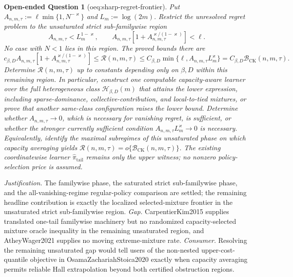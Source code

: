 \documentclass{article}
\newtheorem{openendedquestion}{Open-ended Question}
\begin{document}
\begin{openendedquestion}[oeq:sharp-regret-frontier]\label{oeq:sharp-regret-frontier}
Put \(A_{n,m,\tau}:=\ell\min\{1,N^{-\varkappa}\}\) and \(L_m:=\log(2m)\). Restrict the unresolved regret problem to the unsaturated strict sub-familywise region
\[
A_{n,m,\tau}<L_m^{1-\varkappa},
\qquad
A_{n,m,\tau}\left[1+A_{n,m,\tau}^{\varkappa/(1-\varkappa)}\right]<\ell.
\]
No case with \(N<1\) lies in this region. The proved bounds there are
\[
c_{\beta,D}A_{n,m,\tau}
\left[1+A_{n,m,\tau}^{\varkappa/(1-\varkappa)}\right]
\le\mathcal R(n,m,\tau)
\le C_{\beta,D}\min\{\ell,A_{n,m,\tau}L_m^{\varkappa}\}
=C_{\beta,D}\mathcal B_{\mathrm{CK}}(n,m,\tau).
\]
Determine \(\mathcal R(n,m,\tau)\) up to constants depending only on \(\beta,D\) within this remaining region. In particular, construct one computable capacity-aware learner over the full heterogeneous class \(\mathcal H_{\beta,D}(m)\) that attains the lower expression, including sparse-dominance, collective-contribution, and local-to-tied mixtures, or prove that another same-class configuration raises the lower bound. Determine whether \(A_{n,m,\tau}\to0\), which is necessary for vanishing regret, is sufficient, or whether the stronger currently sufficient condition \(A_{n,m,\tau}L_m^{\varkappa}\to0\) is necessary. Equivalently, identify the maximal subregimes of this unsaturated phase on which capacity averaging yields \(\mathcal R(n,m,\tau)=o\{\mathcal B_{\mathrm{CK}}(n,m,\tau)\}\). The existing coordinatewise learner \(\widehat\pi_{\mathrm{tail}}\) remains only the upper witness; no nonzero policy-selection price is assumed.
\end{openendedquestion}
\par\smallskip\noindent \textit{Justification.} The familywise phase, the saturated strict sub-familywise phase, and the all-vanishing-regime regular-policy comparison are settled; the remaining headline contribution is exactly the localized selected-mixture frontier in the unsaturated strict sub-familywise region. \textit{Gap.} CarpentierKim2015 supplies translated one-tail familywise machinery but no randomized capacity-selected mixture oracle inequality in the remaining unsaturated region, and AtheyWager2021 supplies no moving extreme-mixture rate. \textit{Consumer.} Resolving the remaining unsaturated gap would tell users of the non-nested upper-cost-quantile objective in OsamaZachariahStoica2020 exactly when capacity averaging permits reliable Hall extrapolation beyond both certified obstruction regions.
\end{document}
